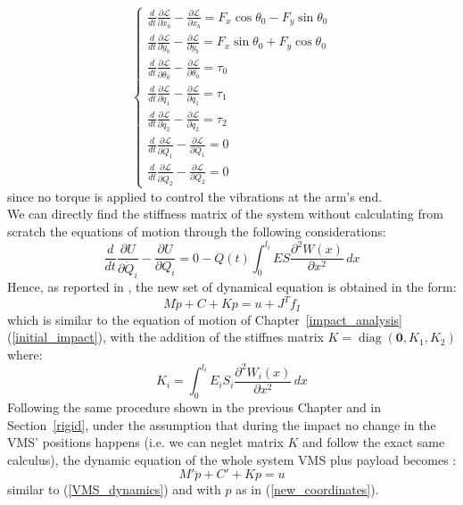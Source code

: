 \documentclass[a4paper,12pt,oneside]{report}
\begin{document}
\begin{equation}
  \begin{cases}
    \frac{d}{dt}\frac{\partial \mathcal{L} }{\partial \dot{x}_b}-\frac{\partial \mathcal{L} }{\partial x_b}=F_x\cos{\theta_0}-F_y\sin{\theta_0}\\
    \frac{d}{dt}\frac{\partial \mathcal{L} }{\partial \dot{y}_b}-\frac{\partial \mathcal{L} }{\partial y_b}=F_x\sin{\theta_0}+F_y\cos{\theta_0}\\
    \frac{d}{dt}\frac{\partial \mathcal{L} }{\partial \dot{\theta}_0}-\frac{\partial \mathcal{L} }{\partial \theta_0}=\tau_0\\
    \frac{d}{dt}\frac{\partial \mathcal{L} }{\partial \dot{q}_1}-\frac{\partial \mathcal{L} }{\partial q_1}=\tau_1\\
    \frac{d}{dt}\frac{\partial \mathcal{L} }{\partial \dot{q}_2}-\frac{\partial \mathcal{L} }{\partial q_2}=\tau_2\\
    \frac{d}{dt}\frac{\partial \mathcal{L} }{\partial \dot{Q}_1}-\frac{\partial \mathcal{L} }{\partial Q_1}=0\\
    \frac{d}{dt}\frac{\partial \mathcal{L} }{\partial \dot{Q}_2}-\frac{\partial \mathcal{L} }{\partial Q_2}=0
  \end{cases}
\end{equation}
since no torque is applied to control the vibrations at the arm's end.\\
We can directly find the stiffness matrix of the system without calculating from scratch the equations of motion through the following considerations:
\begin{equation}
  \frac{d}{dt}\frac{\partial U}{\partial \dot{Q}_i}-\frac{\partial U}{\partial Q_i}=0-Q(t)\int_{0}^{l_i}ES\frac{\partial^2 W(x)}{\partial x^2}\,dx
\end{equation}
Hence, as reported in \cite{sixteen}, the new set of dynamical equation is obtained in the form:
\begin{equation}
  M\ddot{p}+C+Kp=u+J^Tf_I
\end{equation}
which is similar to the equation of motion of Chapter~\ref{impact_analysis} (\ref{initial_impact}), with the addition of the stiffnes matrix $K=\operatorname{diag}(\textbf{0},K_1,K_2)$ where:
\begin{equation}
  K_i=\int_{0}^{l_i}E_iS_i\frac{\partial^2 W_i(x)}{\partial x^2}\,dx
\end{equation}
Following the same procedure shown in the previous Chapter and in Section~\ref{rigid}, under the assumption that during the impact no change in the VMS' positions happens (i.e. we can neglet matrix $K$ and follow the exact same calculus), the dynamic equation of the whole system VMS plus payload becomes \cite{sixteen}:
\begin{equation}
  M'\ddot{p}+C'+Kp=u
\end{equation}
similar to (\ref{VMS_dynamics}) and with $p$ as in (\ref{new_coordinates}).
\newpage
\end{document}
